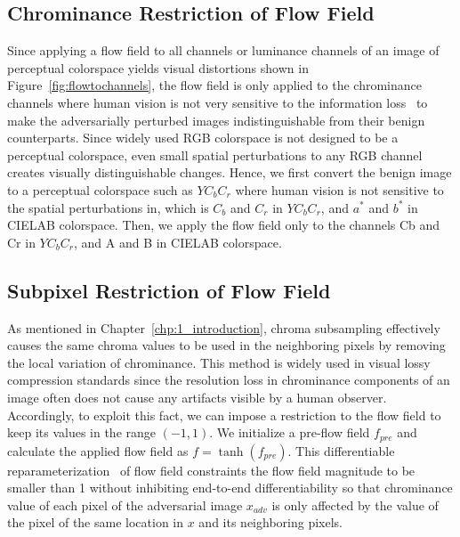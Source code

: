 \subsection{Chrominance Restriction of Flow Field}
Since applying a flow field to all channels or luminance channels of an image of perceptual colorspace yields visual distortions shown in Figure~\ref{fig:flowtochannels}, the flow field is only applied to the chrominance channels where human vision is not very sensitive to the information loss~\cite{vorobyev2004ecology} to make the adversarially perturbed images indistinguishable from their benign counterparts. Since widely used RGB colorspace is not designed to be a perceptual colorspace, even small spatial perturbations to any RGB channel creates visually distinguishable changes. Hence, we first convert the benign image to a perceptual colorspace such as \(YC_{b}C_{r}\) where human vision is not sensitive to the spatial perturbations in, which is \(C_{b}\) and \(C_{r}\) in \(YC_{b}C_{r}\), and \(a^*\) and \(b^*\) in CIELAB colorspace. Then, we apply the flow field only to the channels Cb and Cr in \(YC_{b}C_{r}\), and A and B in CIELAB colorspace.

\subsection{Subpixel Restriction of Flow Field}
As mentioned in Chapter~\ref{chp:1_introduction}, chroma subsampling effectively causes the same chroma values to be used in the neighboring pixels by removing the local variation of chrominance. This method is widely used in visual lossy compression standards since the resolution loss in chrominance components of an image often does not cause any artifacts visible by a human observer. Accordingly, to exploit this fact, we can impose a restriction to the flow field to keep its values in the range \((-1, 1)\). We initialize a pre-flow field \(f_{pre}\) and calculate the applied flow field as \(f = \tanh(f_{pre})\). This differentiable reparameterization~\cite{mordvintsev2018differentiable} of flow field constraints the flow field magnitude to be smaller than 1 without inhibiting end-to-end differentiability so that chrominance value of each pixel of the adversarial image \(x_{adv}\) is only affected by the value of the pixel of the same location in \(x\) and its neighboring pixels. %




